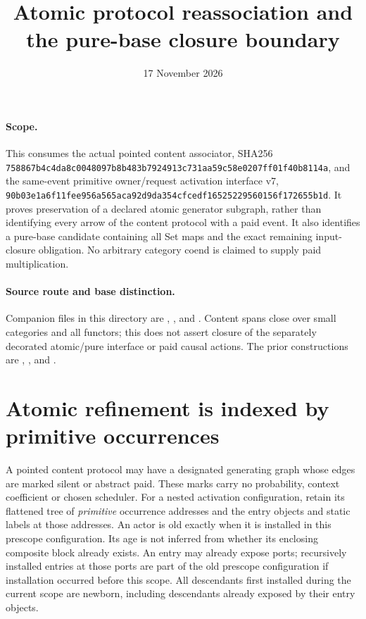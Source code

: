 \documentclass[11pt]{article}
\title{Atomic protocol reassociation and the pure-base closure boundary}
\date{17 November 2026}
\begin{document}
\maketitle
\paragraph{Scope.} This consumes the actual pointed content associator, SHA256 \texttt{758867b4c4da8c0048097b8b483b7924913c731aa59c58e0207ff01f40b8114a}, and the same-event primitive owner/request activation interface v7, \texttt{90b03e1a6f11fee956a565aca92d9da354cfcedf16525229560156f172655b1d}. It proves preservation of a declared atomic generator subgraph, rather than identifying every arrow of the content protocol with a paid event. It also identifies a pure-base candidate containing all Set maps and the exact remaining input-closure obligation. No arbitrary category coend is claimed to supply paid multiplication.

\paragraph{Source route and base distinction.} Companion files in this directory are \texttt{}, \texttt{}, and \texttt{}. Content spans close over small categories and all functors; this does not assert closure of the separately decorated atomic/pure interface or paid causal actions. The prior constructions are \texttt{}, \texttt{}, and \texttt{}.

\section{Atomic refinement is indexed by primitive occurrences}
A pointed content protocol may have a designated generating graph whose edges are marked silent or abstract paid. These marks carry no probability, context coefficient or chosen scheduler. For a nested activation configuration, retain its flattened tree of \emph{primitive} occurrence addresses and the entry objects and static labels at those addresses. An actor is old exactly when it is installed in this prescope configuration. Its age is not inferred from whether its enclosing composite block already exists. An entry may already expose ports; recursively installed entries at those ports are part of the old prescope configuration if installation occurred before this scope. All descendants first installed during the current scope are newborn, including descendants already exposed by their entry objects.
\end{document}
